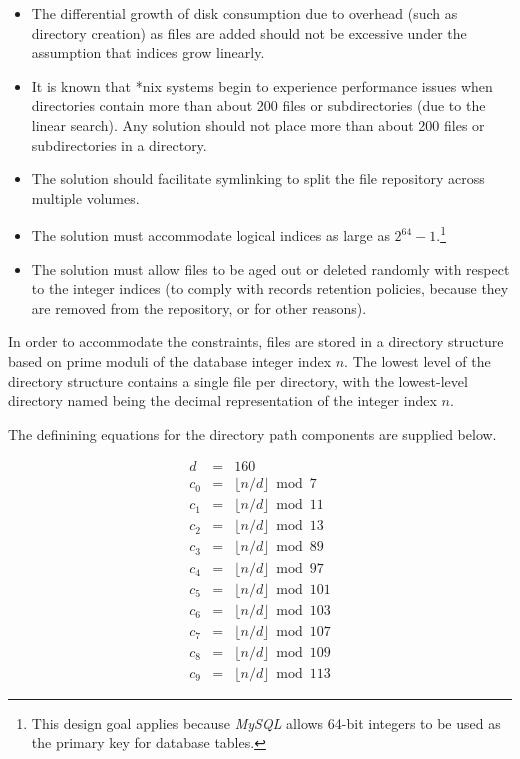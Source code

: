\begin{itemize}
\item The differential growth of disk consumption due to overhead (such as
      directory creation) as files are added
      should not be excessive under the assumption that indices grow linearly. 
\item It is known that *nix systems begin to experience performance issues
      when directories contain more than about 200 files or subdirectories (due to
      the linear search).  Any solution should not place more than about 200 files
      or subdirectories in a directory.
\item The solution should facilitate symlinking to split the file
      repository across multiple volumes.
\item The solution must accommodate logical indices as large as $2^{64}-1$.\footnote{This design
      goal applies because \emph{MySQL} allows 64-bit integers to be used as the primary
      key for database tables.}
\item The solution must allow files to be aged out or deleted
      randomly with respect to the integer indices (to comply with records retention
      policies, because they are removed from the repository, or for other reasons).
\end{itemize}

In order to accommodate the constraints, files are stored in a directory structure
based on prime moduli of the database integer index $n$.  
The lowest level of the directory structure contains a single
file per directory, with the lowest-level directory named being the 
decimal representation of the
integer index $n$.

The definining equations for the directory path components are supplied below.

\begin{eqnarray}
\label{eq:ctbg0:sddd0:sfro0:00}   d    & = & 160                               \\
\label{eq:ctbg0:sddd0:sfro0:01} c_0    & = & \lfloor n / d \rfloor \bmod 7   \\
\label{eq:ctbg0:sddd0:sfro0:02} c_1    & = & \lfloor n / d \rfloor \bmod 11  \\ 
\label{eq:ctbg0:sddd0:sfro0:03} c_2    & = & \lfloor n / d \rfloor \bmod 13  \\
\label{eq:ctbg0:sddd0:sfro0:04} c_3    & = & \lfloor n / d \rfloor \bmod 89  \\
\label{eq:ctbg0:sddd0:sfro0:05} c_4    & = & \lfloor n / d \rfloor \bmod 97  \\
\label{eq:ctbg0:sddd0:sfro0:06} c_5    & = & \lfloor n / d \rfloor \bmod 101 \\
\label{eq:ctbg0:sddd0:sfro0:07} c_6    & = & \lfloor n / d \rfloor \bmod 103 \\
\label{eq:ctbg0:sddd0:sfro0:08} c_7    & = & \lfloor n / d \rfloor \bmod 107 \\
\label{eq:ctbg0:sddd0:sfro0:09} c_8    & = & \lfloor n / d \rfloor \bmod 109 \\
\label{eq:ctbg0:sddd0:sfro0:10} c_9    & = & \lfloor n / d \rfloor \bmod 113 
\end{eqnarray}

